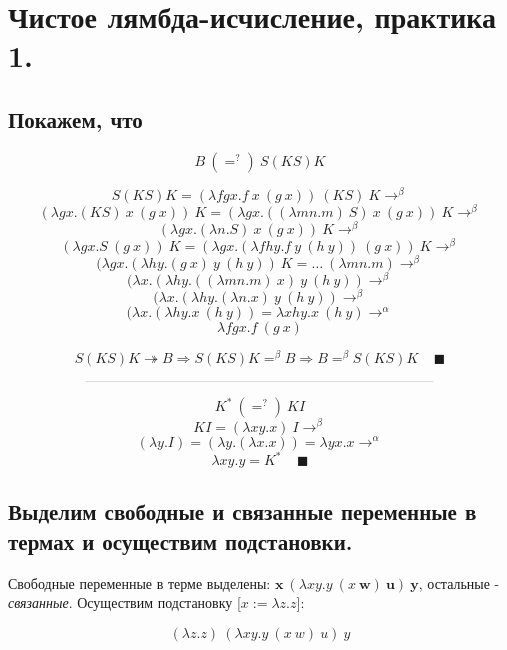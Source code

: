 \documentclass[a4paper,12pt]{article}
\date{ВШЭ ПМИ, 2022 г.}
\author{Алексей Косенко}
\theoremstyle{plain} %
\theoremstyle{definition} %
\theoremstyle{remark} %
\begin{document}
\maketitle

\section{Чистое лямбда-исчисление, практика 1.}
\subsection{Покажем, что}

$$B \ \left(=^{?}\right) \ S(KS)K$$

$$S(KS)K = (\lambda fgx.f \ x \ (g \ x) ) \ (KS) \ K \rightarrow^{\beta}$$
$$(\lambda gx.(KS) \ x \ (g \ x)) \ K = (\lambda gx.((\lambda m n. m) \ S) \ x \ (g \ x)) \ K \rightarrow^{\beta}$$
$$(\lambda gx.(\lambda n. S) \ x \ (g \ x)) \ K \rightarrow^{\beta}$$
$$(\lambda gx. S \ (g \ x)) \ K = (\lambda gx.  (\lambda f  h y. f  \ y \ (h \ y)) \ (g \ x)) \ K  \rightarrow^{\beta} $$
$$(\lambda gx.  (\lambda h y. (g \ x)  \ y \ (h \ y))  \ K  = \dots  \ (\lambda m n. m) \rightarrow^{\beta}$$
$$(\lambda x.  (\lambda h y. ((\lambda m n. m) \ x)  \ y \ (h \ y)) \rightarrow^{\beta}$$
$$(\lambda x.  (\lambda h y. (\lambda n. x)  \ y \ (h \ y)) \rightarrow^{\beta}$$
$$(\lambda x.  (\lambda h y. x \ (h \ y)) = \lambda xhy.x \ (h \ y) \rightarrow^{\alpha}$$
$$\lambda fgx.f \ (g \ x)$$

$$S(KS)K \twoheadrightarrow B \Rightarrow S(KS)K =^{\beta} B \Rightarrow B =^{\beta} S(KS)K \ \ \ \ \ \blacksquare $$

$$\rule{25em}{0.01em}$$

$$K^{*} \ \left(=^{?}\right) \ KI$$
$$KI = (\lambda x y. x) \ I \rightarrow^{\beta}$$
$$(\lambda y. I) = (\lambda y. (\lambda x. x)) = \lambda y x. x \rightarrow^{\alpha}$$
$$\lambda x y. y = K^* \ \ \ \ \ \blacksquare$$

\subsection{Выделим свободные и связанные переменные в термах и осуществим подстановки.}

Свободные переменные в терме выделены: $\boldsymbol{x} \ (\lambda x y. y \ (x \ \boldsymbol{w}) \ \boldsymbol{u}) \ \boldsymbol{y}$, остальные - \textit{связанные}. Осуществим подстановку [$x := \lambda z. z$]:

$$ (\lambda z. z) \ (\lambda x y. y \ (x \ w) \ u) \ y $$
\end{document}
